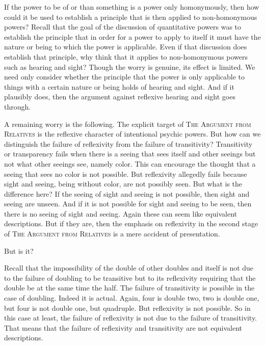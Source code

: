 If the power to be of or than something is a power only homonymously, then how could it be used to establish a principle that is then applied to non-homo\-nym\-ous powers? Recall that the goal of the discussion of quantitative powers was to establish the principle that in order for a power to apply to itself it must have the nature or being to which the power is applicable. Even if that discussion does establish that principle, why think that it applies to non-homonymous powers such as hearing and sight? Though the worry is genuine, its effect is limited. We need only consider whether the principle that the power is only applicable to things with a certain nature or being holds of hearing and sight. And if it plausibly does, then the argument against reflexive hearing and sight goes through.

A remaining worry is the following. The explicit target of \textsc{The Argument from Relatives} is the reflexive character of intentional psychic powers. But how can we distinguish the failure of reflexivity from the failure of transitivity? Transitivity or transparency fails when there is a seeing that sees itself and other seeings but not what other seeings see, namely color. This can encourage the thought that a seeing that sees no color is not possible. But reflexivity allegedly fails because sight and seeing, being without color, are not possibly seen. But what is the difference here? If the seeing of sight and seeing is not possible, then sight and seeing are unseen. And if it is not possible for sight and seeing to be seen, then there is no seeing of sight and seeing. Again these can seem like equivalent descriptions. But if they are, then the emphasis on reflexivity in the second stage of \textsc{The Argument from Relatives} is a mere accident of presentation.

But is it?

Recall that the impossibility of the double of other doubles and itself is not due to the failure of doubling to be transitive but to its reflexivity requiring that the double be at the same time the half. The failure of transitivity is possible in the case of doubling. Indeed it is actual. Again, four is double two, two is double one, but four is not double one, but quadruple. But reflexivity is not possible. So in this case at least, the failure of reflexivity is not due to the failure of transitivity. That means that the failure of reflexivity and transitivity are not equivalent descriptions.

